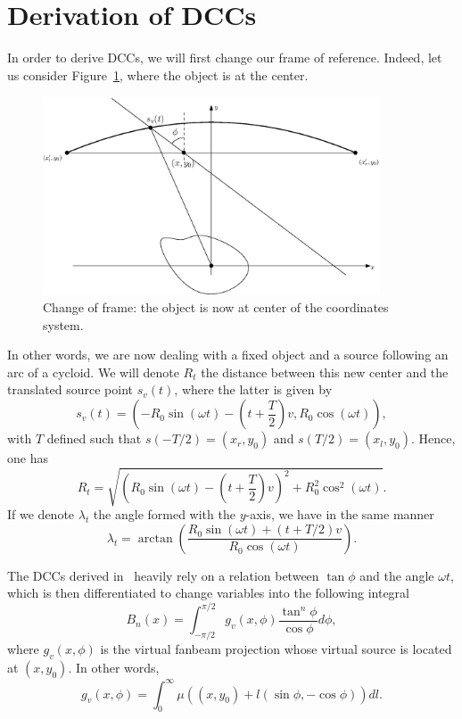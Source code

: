 \documentclass[a4paper]{article}
\numberwithin{equation}{section}
\begin{document}
\section{Derivation of DCCs}

In order to derive DCCs, we will first change our frame of reference. Indeed, let us consider Figure~\ref{fig:change_frame}, where the object is at the center.
\begin{figure}[!ht]
	\centering
	\includegraphics[width=10cm]{frame_object.eps}
	\caption{Change of frame: the object is now at center of the coordinates system.\label{fig:change_frame}}
\end{figure}
In other words, we are now dealing with a fixed object and a source following an arc of a cycloid. We will denote $R_t$ the distance between this new center and the translated source point $s_v(t)$, where the latter is given by
\begin{equation}
	s_v(t) = \left( -R_0 \sin(\omega t) - \left( t + \frac{T}{2} \right)v, R_0 \cos(\omega t) \right),
\end{equation}
with $T$ defined such that $s(-T/2) = \left(x_r,y_0\right) $ and $s(T/2) = \left(x_l,y_0\right)$. Hence, one has
\begin{equation}
R_t = \sqrt{ \left( R_0 \sin(\omega t) - \left( t + \frac{T}{2} \right)v \right)^2 + R_0^2 \cos^2(\omega t) }.	
\end{equation}
If we denote $\lambda_t$ the angle formed with the $y$-axis, we have in the same manner
\begin{equation}
\lambda_t = \arctan \left( \frac{R_0 \sin(\omega t) + \left( t + T/2 \right)v}{R_0 \cos(\omega t)} \right).
\end{equation}

The DCCs derived in~\cite{clackdoyle2015consistency} heavily rely on a relation between $\tan \phi$ and the angle $\omega t$, which is then differentiated to change variables into the following integral
\begin{equation}
	B_n(x) = \int_{-\pi/2}^{\pi/2} g_v(x,\phi) \frac{\tan^n \phi}{\cos \phi} d\phi,	
	\label{eq:Bn_x_phi}
\end{equation}
where $g_v(x,\phi)$ is the virtual fanbeam projection whose virtual source is located at $(x,y_0)$. In other words,
\begin{equation}
	g_v(x,\phi) = \int_0^{\infty} \mu\left( (x,y_0) + l(\sin \phi, -\cos \phi) \right) dl.
\end{equation}
\end{document}
